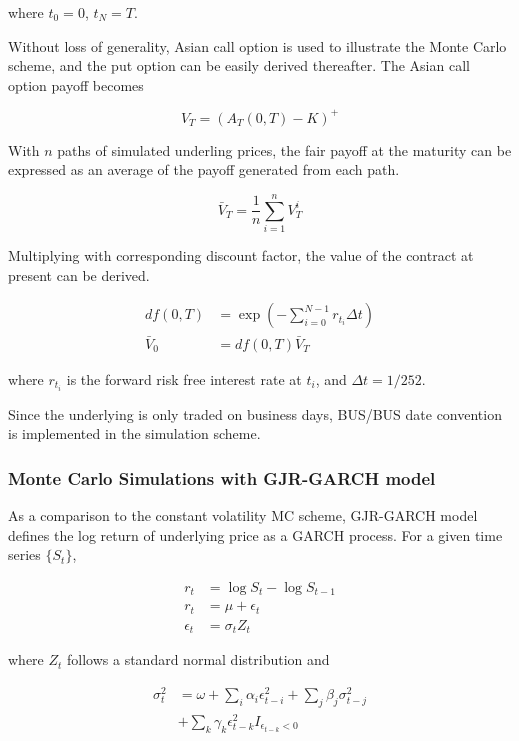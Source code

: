 \documentclass[10pt, a4paper, twocolumn]{article} %
\begin{document}
where $t_0 = 0$, $t_N = T$.

Without loss of generality, Asian call option is used to illustrate the Monte Carlo scheme, and the put option can be easily derived thereafter. The Asian call option payoff becomes

\[ V_T = (A_T(0,T) - K)^+\]

With $n$ paths of simulated underling prices, the fair payoff at the maturity can be expressed as an average of the payoff generated from each path.

\[\bar V_T = \frac 1n \sum_{i=1}^n V_T^i \]

Multiplying with corresponding discount factor, the value of the contract at present can be derived.

\begin{equation}
\begin{aligned}
df(0,T) &= \exp (-\sum_{i=0}^{N-1} r_{t_i}\Delta t)
\\
\bar V_0 &= df(0,T) \bar V_T
\end{aligned}
\end{equation}

where $r_{t_i}$ is the forward risk free interest rate at $t_i$, and $\Delta t = 1/252$.

Since the underlying is only traded on business days, BUS/BUS date convention is implemented in the simulation scheme.

\subsubsection{Monte Carlo Simulations with GJR-GARCH model}

As a comparison to the constant volatility MC scheme, GJR-GARCH model defines the log return of underlying price as a GARCH process. For a given time series $\{ S_t\}$,

\begin{equation}
\begin{aligned}
r_t &= \log S_t - \log S_{t-1}
\\
r_t &= \mu +\epsilon_t
\\
\epsilon_t &= \sigma_t Z_t
\end{aligned}
\end{equation}

where $Z_t$ follows a standard normal distribution and

\begin{equation}
\begin{aligned}
\sigma_t^2 &= \omega + \sum_i {\alpha_i \epsilon_{t-i}^2} + \sum_j {\beta_j \sigma_{t-j}^2}  \\
&+ \sum_k {\gamma_k \epsilon_{t-k}^2 I_{\epsilon_{t-k} < 0}}
\end{aligned}
\end{equation}
\end{document}
